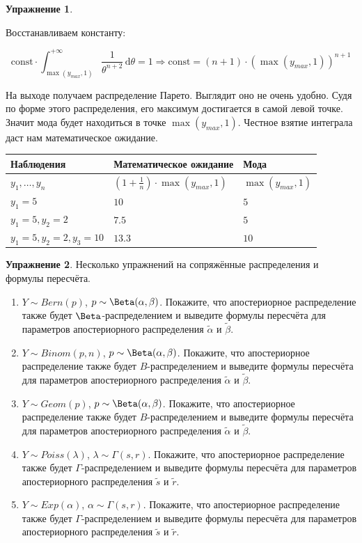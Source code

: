 \documentclass[12pt, a4paper, oneside]{extreport}
\newcommand{\const}{\mathrm{const}}        %
\newcommand{\dx}[1]{\,\mathrm{d}#1} %
\theoremstyle{plain}              %
\theoremstyle{definition}         %
\newtheorem{problem}{\color{myblue} Упражнение}
\begin{document}
\begin{problem}
\begin{sol}
Восстанавливаем константу: 

\[
\const \cdot \int_{\max(y_{max},1)}^{+\infty} \frac{1}{\theta^{n+2}} \dx{\theta} = 1  \Rightarrow  \const = (n+1)\cdot(\max(y_{max},1))^{n+1}
\]

На выходе получаем распределение Парето. Выглядит оно не очень удобно. Судя по форме этого распределения, его максимум достигается в самой левой точке. Значит мода будет находиться в точке $\max(y_{max},1)$. Честное взятие интеграла даст нам математическое ожидание.

\begin{tabularx}{\textwidth}{X|X|X}
Наблюдения & Математическое ожидание & Мода \\
\hline
$y_1, \ldots, y_n$ & $(1 + \frac{1}{n}) \cdot \max(y_{max},1)$ & $\max(y_{max},1)$ \\
$y_1 = 5$ & $10$ & $5$ \\
$y_1 = 5, y_2 = 2$ & $7.5$ & $5$ \\
$y_1=5, y_2=2, y_3=10$ &  $13.3$ & $10$ 
\end{tabularx}


\end{sol}
\end{problem}


\begin{problem}
	Несколько упражнений на сопряжённые распределения и формулы пересчёта. 
	\begin{enumerate} 
		\item $Y \sim Bern(p)$, $p \sim \Beta(\alpha, \beta)$. Покажите, что апостериорное распределение также будет $\Beta$-распределением и выведите формулы пересчёта для параметров апостериорного распределения $\tilde{\alpha} $ и $\tilde \beta$.
		\item $Y \sim Binom(p,n)$,  $p \sim \Beta(\alpha, \beta)$. Покажите, что апостериорное распределение также будет $B$-распределением и выведите формулы пересчёта для параметров апостериорного распределения $\tilde{\alpha} $ и $\tilde \beta$.
		\item  $Y \sim Geom(p)$,  $p \sim \Beta(\alpha, \beta)$. Покажите, что апостериорное распределение также будет $B$-распределением и выведите формулы пересчёта для параметров апостериорного распределения $\tilde{\alpha} $ и $\tilde \beta$.
		\item  $Y \sim Poiss(\lambda)$, $\lambda \sim  \Gamma(s,r)$. Покажите, что апостериорное распределение также будет $\Gamma$-распределением и выведите формулы пересчёта для параметров апостериорного распределения $\tilde{s} $ и $\tilde r$.
		\item $Y \sim Exp(\alpha)$, $\alpha \sim \Gamma(s,r)$. Покажите, что апостериорное распределение также будет $\Gamma$-распределением и выведите формулы пересчёта для параметров апостериорного распределения $\tilde{s} $ и $\tilde r$.
	\end{enumerate}
	\begin{sol}
	\end{sol}
\end{problem}
\end{document}
